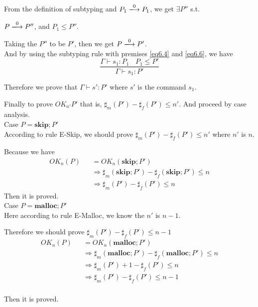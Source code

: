 \documentclass[english]{jssst_ppl} %
\newcommand\SKIP{\mathbf{skip}}
\newcommand\Malloc{\mathbf{malloc}}
\theoremstyle{definition}
\begin{document}
From the definition of subtyping and $P_{1} \xlongrightarrow{0} P_{1}$, we get $\exists P''$ s.t.
\begin{center}
$P \xlongrightarrow{0} P''$, and $P_{1} \le P''$.
\end{center}

Taking the $P''$ to be $P'$, then we get $P \xlongrightarrow{0} P'$.\\
And by using the subtyping rule with premises \eqref{eq6.4} and  \eqref{eq6.6}, we have
$$
\frac{\Gamma \vdash s_{1} : P_{1} \ \ \ \ P_{1} \le P'}{\Gamma \vdash s_{1} : P'}
$$

Therefore we prove that $\Gamma \vdash s' : P'$ where $s'$ is the command $s_{1}$.

\noindent Finally to prove $OK_{n'}P'$ that is, $\sharp_{m}(P')-\sharp_{f}(P') \le n'$. And  proceed by case analysis.\\

\noindent Case $P =  \SKIP;P'$\\

According to rule E-Skip, we should prove  $\sharp_{m}(P')-\sharp_{f}(P') \le n'$ where $n'$ is $n$.

Because we have
\begin{eqnarray*}
  OK_{n}(P)  & & =  OK_{n}(\SKIP;P')\\
  & & \Rightarrow \sharp_{m}(\SKIP;P') - \sharp_{f}(\SKIP;P') \le n \\
  & & \Rightarrow \sharp_{m}(P') - \sharp_{f}(P') \le n \
\end{eqnarray*}
Then it is proved. \\

\noindent Case $P = \Malloc;P'$ \\

Here according to rule E-Malloc, we know the $n'$ is $n-1$.

Therefore we should prove $\sharp_{m}(P') - \sharp_{f}(P') \le n-1$
\begin{eqnarray*}
  OK_{n}(P)&& =  OK_{n}(\Malloc;P')\\
  &&\Rightarrow \sharp_{m}(\Malloc;P') - \sharp_{f}(\Malloc;P') \le n \\
  &&\Rightarrow  \sharp_{m}(P') + 1 - \sharp_{f}(P') \le n\\
  &&\Rightarrow  \sharp_{m}(P')  - \sharp_{f}(P') \le n-1\\
\end{eqnarray*}

Then it is proved.\\
\end{document}
